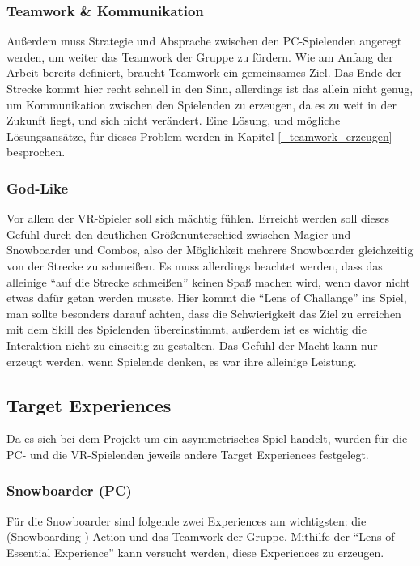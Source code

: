 \subsubsection{Teamwork \& Kommunikation}
Außerdem muss Strategie und Absprache zwischen den PC-Spielenden angeregt werden, um weiter das Teamwork der Gruppe zu fördern. Wie am Anfang der Arbeit bereits definiert, braucht Teamwork ein gemeinsames Ziel. Das Ende der Strecke kommt hier recht schnell in den Sinn, allerdings ist das allein nicht genug, um Kommunikation zwischen den Spielenden zu erzeugen, da es zu weit in der Zukunft liegt, und sich nicht verändert. Eine Lösung, und mögliche Lösungsansätze, für dieses Problem werden in Kapitel \ref{_teamwork_erzeugen} besprochen.

\subsubsection{God-Like}
Vor allem der VR-Spieler soll sich mächtig fühlen. Erreicht werden soll dieses Gefühl durch den deutlichen Größenunterschied zwischen Magier und Snowboarder und Combos, also der Möglichkeit mehrere Snowboarder gleichzeitig von der Strecke zu schmeißen. Es muss allerdings beachtet werden, dass das alleinige "`auf die Strecke schmeißen"' keinen Spaß machen wird, wenn davor nicht etwas dafür getan werden musste. Hier kommt die "`Lens of Challange"'\cite{_art_of_gamedesign} ins Spiel, man sollte besonders darauf achten, dass die Schwierigkeit das Ziel zu erreichen mit dem Skill des Spielenden übereinstimmt, außerdem ist es wichtig die Interaktion nicht zu einseitig zu gestalten. Das Gefühl der Macht kann nur erzeugt werden, wenn Spielende denken, es war ihre alleinige Leistung.

\subsection{Target Experiences}

Da es sich bei dem Projekt um ein asymmetrisches Spiel handelt, wurden für die PC- und die VR-Spielenden jeweils andere Target Experiences festgelegt.

\subsubsection{Snowboarder (PC)}
Für die Snowboarder sind folgende zwei Experiences am wichtigsten: die (Snowboarding-) Action und das Teamwork der Gruppe. Mithilfe der "`Lens of Essential Experience"'\cite[S. 55]{_art_of_gamedesign} kann versucht werden, diese Experiences zu erzeugen.

